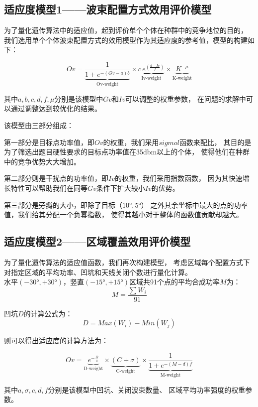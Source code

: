 \documentclass[UTF8,12pt]{ctexart}
\begin{document}
    \subsection[适应度模型1]{适应度模型1——波束配置方式效用评价模型}\label{SYDY}
        为了量化遗传算法中的适应值，起到评价单个个体在种群中的竞争地位的目的，
        我们选用单个个体波束配置方式的效用模型作为其适应度的参考值，模型的构建如下：
        \begin{Large}
            $$Ov = \underbrace{\frac{1}{1+e^{-(Gv-a)b}}}_{\text{Ov-weight}}×\underbrace{c\, e^{(\frac{d-Iv}{f})}}_{\text{Iv-weight}}×\underbrace{{K}^{-μ}}_{\text{K-weight}}$$
        \end{Large}
        其中$a,b,c,d,f,μ$分别是该模型中$Gv$和$Iv$可以调整的权重参数，
        在问题的求解中可以通过调整达到较优化的结果。\par

        \noindent 该模型由三部分组成：\par
        第一部分是目标点功率值，即$Ov$的权重，我们采用$sigmol$函数来配比，
        其目的是为了筛选出题目硬性要求的目标点功率值在35dbm以上的个体，
        使得他们在种群中的竞争优势大大增加。\par
        第二部分则是干扰点的功率值，即$Iv$的权重，我们采用指数函数，
        因为其快速增长特性可以帮助我们在同等$Gv$条件下扩大较小$Iv$的优势。\par
        第三部分是旁瓣的大小，即除了目标（$10°,5°$）
        之外其余坐标中最大的点的功率值，我们给其分配一个负幂指数，
        使得其越小对于整体的函数值贡献却越大。


    \subsection[适应度模型2]{适应度模型2——区域覆盖效用评价模型}\label{SYDE}
        为了量化遗传算法的适应值函数，我们再次构建模型，
        考虑区域每个配置方式下对指定区域的平均功率、凹坑和天线关闭个数进行量化计算。\\
        水平$(-30°,+30°)$，竖直$(-15°,+15°)$区域共91个点的平均合成功率$M$为：
        $$M = \frac {\sum{W_i}} {91}$$
    
        \noindent 凹坑$D$的计算公式为：
        $$D = Max(W_i)-Min(W_j)$$
    
        \noindent 则可以得出适应度的计算方法为：
        \begin{Large}
            $$Ov = \underbrace{e^{-\frac {D}{a}}}_{\text{D-weight}}×\underbrace{(C+σ)}_{\text{C-weight}}× \underbrace{\frac {1}{1+e^{-(M-d)f}}}_{\text{M-weight}}$$
        \end{Large}
        其中$a,σ,c,d,f$分别是该模型中凹坑、关闭波束数量、
        区域平均功率强度的权重参数。\par
        
\end{document}
